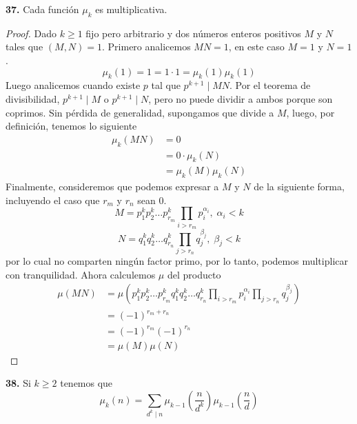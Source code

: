 \documentclass{article}
\newenvironment{statement}[1]{\smallskip\noindent\color[rgb]{1.00,0.00,0.50} {\bf #1.}}{}
\theoremstyle{definition}
\theoremstyle{remark}
\begin{document}
\begin{statement}{37}
Cada funci\'on $\mu_k$ es multiplicativa.
\end{statement}
\begin{proof}
Dado $k \geq 1$ fijo pero arbitrario y dos n\'umeros enteros positivos $M$ y $N$ tales que $(M, N) = 1$.
Primero analicemos $MN = 1$, en este caso $M = 1$ y $N = 1$.
$$\mu_k(1) = 1 = 1\cdot1 = \mu_k(1)\mu_k(1)$$
Luego analicemos cuando existe $p$ tal que $p^{k + 1} \mid MN$. Por el teorema de divisibilidad, $p^{k + 1} \mid M$ o $p^{k + 1} \mid N$, pero no puede dividir a ambos porque son coprimos. Sin p\'erdida de generalidad, supongamos que divide a $M$, luego, por definici\'on, tenemos lo siguiente
\begin{align*}
    \mu_k(MN) &= 0\\
    &= 0 \cdot \mu_k(N)\\
    &= \mu_k(M)\mu_k(N)
\end{align*}
Finalmente, consideremos que podemos expresar a $M$ y $N$ de la siguiente forma, incluyendo el caso que $r_m$ y $r_n$ sean $0$.
$$M = p_1^k p_2^k\dots p_{r_m}^k\prod_{i > r_m} p_i^{\alpha_i},\;\alpha_i < k$$
$$N = q_1^k q_2^k\dots q_{r_n}^k\prod_{j > r_n} q_j^{\beta_j},\;\beta_j < k$$por lo cual no comparten ning\'un factor primo, por lo tanto, podemos multiplicar con tranquilidad. Ahora calculemos $\mu$ del producto
\begin{align*}
    \mu(MN) &= \mu(p_1^k p_2^k\dots p_{r_m}^k q_1^k q_2^k\dots q_{r_n}^k\prod_{i > r_m} p_i^{\alpha_i} \prod_{j > r_n} q_j^{\beta_j})\\
    &= (-1)^{r_m + r_n}\\
    &= (-1)^{r_m}(-1)^{r_n}\\
    &= \mu(M)\mu(N)
\end{align*}
\end{proof}
\begin{statement}{38}
Si $k \geq 2$ tenemos que 
$$\mu_k(n) = \sum_{d^k \mid n}\mu_{k - 1}\left (\frac{n}{d^k}\right )\mu_{k - 1}\left (\frac{n}{d} \right )$$
\end{statement}
\end{document}
